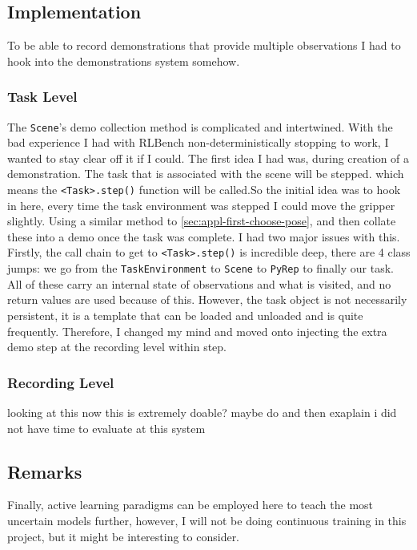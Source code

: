 \subsection{Implementation}
To be able to record demonstrations that provide multiple observations I had to hook into the demonstrations system somehow.

\subsubsection{Task Level}
The \verb|Scene|'s demo collection method is complicated and intertwined. With the bad experience I had with RLBench non-deterministically stopping to work, I wanted to stay clear off it if I could. The first idea I had was, during creation of a demonstration. The task that is associated with the scene will be stepped. which means the \verb|<Task>.step()| function will be called.So the initial idea was to hook in here, every time the task environment was stepped I could move the gripper slightly. Using a similar method to \ref{sec:appl-first-choose-pose}, and then collate these into a demo once the task was complete. 
I had two major issues with this. Firstly, the call chain to get to \verb|<Task>.step()| is incredible deep, there are 4 class jumps: we go from the \verb|TaskEnvironment| to \verb|Scene| to \verb|PyRep| to finally our task. All of these carry an internal state of observations and what is visited, and no return values are used because of this. However, the task object is not necessarily persistent, it is a template that can be loaded and unloaded and is quite frequently. Therefore, I changed my mind and moved onto injecting the extra demo step at the recording level within step.

\subsubsection{Recording Level}\todo[color=red]{}
looking at this now this is extremely doable? maybe do and then exaplain i did not have time to evaluate at this system

\subsection{Remarks}\todo{}
Finally, active learning paradigms can be employed here to teach the most uncertain models further, however, I will not be doing continuous training in this project, but it might be interesting to consider.